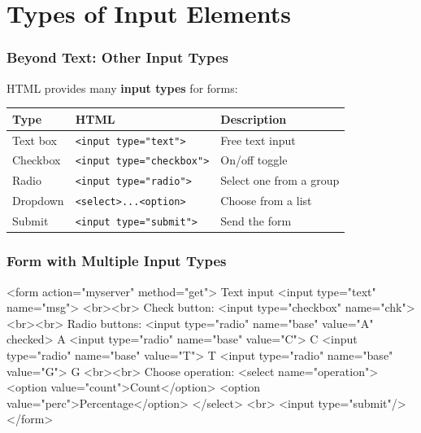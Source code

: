 \documentclass[xcolor=table]{beamer}
\begin{document}

\section{Types of Input Elements}

\begin{frame}[fragile]
\frametitle{Beyond Text: Other Input Types}

HTML provides many \textbf{input types} for forms:

\vspace{0.2cm}

\begingroup\small
\begin{center}
\begin{tabular}{|l|l|l|}
\hline
\textbf{Type} & \textbf{HTML} & \textbf{Description} \\
\hline
Text box & \texttt{<input type="text">} & Free text input \\
\hline
Checkbox & \texttt{<input type="checkbox">} & On/off toggle \\
\hline
Radio & \texttt{<input type="radio">} & Select one from a group \\
\hline
Dropdown & \texttt{<select>...<option>} & Choose from a list \\
\hline
Submit & \texttt{<input type="submit">} & Send the form \\
\hline
\end{tabular}
\end{center}
\endgroup

\end{frame}

\begin{frame}[fragile]
\frametitle{Form with Multiple Input Types}

\begin{htmlcode}[basicstyle=\ttm\scriptsize]
<form action="myserver" method="get">
  Text input
  <input type="text" name="msg">
  <br><br>
  Check button:
  <input type="checkbox" name="chk">
  <br><br>
  Radio buttons:
  <input type="radio" name="base" value="A" checked> A
  <input type="radio" name="base" value="C"> C
  <input type="radio" name="base" value="T"> T
  <input type="radio" name="base" value="G"> G
  <br><br>
  Choose operation:
  <select name="operation">
    <option value="count">Count</option>
    <option value="perc">Percentage</option>
  </select>
  <br>
  <input type="submit"/>
</form>
\end{htmlcode}

\end{frame}
\end{document}
